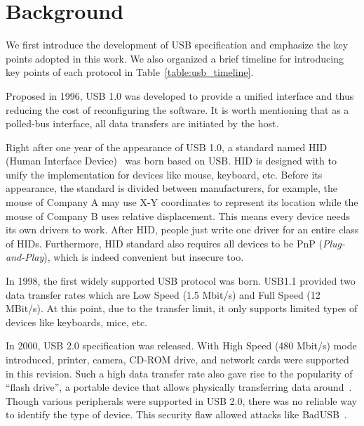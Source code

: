\section{Background}
\label{sec:background}

We first introduce the development of USB specification and emphasize the key
points adopted in this work. We also organized a brief timeline for introducing
key points of each protocol in Table~\ref{table:usb_timeline}.

Proposed in 1996, USB 1.0\cite{usb10} was developed to provide a unified
interface and thus reducing the cost of reconfiguring the software. It is
worth mentioning that as a polled-bus interface, all data transfers are
initiated by the host.

Right after one year of the appearance of USB 1.0, a standard named HID (Human
Interface Device)~\cite{hid} was born based on USB. HID is
designed with to unify the implementation for devices like mouse,
keyboard, etc. Before its appearance, the standard is divided between
manufacturers, for example, the mouse of Company A may use X-Y coordinates to
represent its location while the mouse of Company B uses relative displacement.
This means every device needs its own drivers to work. After HID, people just
write one driver for an entire class of HIDs. Furthermore, HID standard also
requires all devices to be PnP (\emph{Plug-and-Play}), which is indeed
convenient but insecure too.

In 1998, the first widely supported USB protocol was born. USB1.1\cite{usb11}
provided two data transfer rates which are Low Speed (1.5 Mbit/s) and Full
Speed (12 MBit/s). At this point, due to the transfer limit, it only supports
limited types of devices like keyboards, mice, etc.

In 2000, USB 2.0\cite{usb20} specification was released. With High Speed (480
Mbit/s) mode introduced, printer, camera, CD-ROM drive, and network cards were
supported in this revision. Such a high data transfer rate also gave rise to the
popularity of ``flash drive'', a portable device that allows physically
transferring data around~\cite{sok}. Though various peripherals were supported
in USB 2.0, there was no reliable way to identify the type of device. This
security flaw allowed attacks like BadUSB~\cite{badusb,rubber}.


